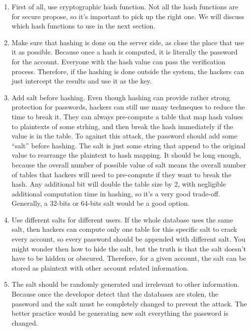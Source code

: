 \documentclass[conference]{IEEEtran}
\begin{document}
\begin{enumerate}[label=\textbf{\arabic*.}]
    \item
First of all, use cryptographic hash function. Not all the hash functions
are for secure propose, so it's important to pick up the right one.
We will discuss 
which hash functions to use in the next section.

    \item
Make sure that hashing is done on the server side,
as close the place that use it as possible.
Because
once a hash is computed, it is literally the password for the account.
Everyone with the hash value can pass the verification process. Therefore,
if the hashing is done outside the system, the hackers can just intercept the results
and use it as the key.

    \item
Add salt before hashing.
Even though hashing can provide rather strong protection for passwords,
hackers can still use many techneques to reduce the time to break it.
They can always pre-compute a table \cite{rainbow} that map
hash values to plaintexts of some strhing, and then
break the hash immediately if the value is in the table.
To against this attack, the password should add some
``salt'' \cite{salt} before hashing.
The salt is just some string that append to the original value to
rearrange the plaintext to hash mapping.
It should be long enough, because the overall number of
possible value of salt means the overall number of tables that
hackers will need to pre-compute if they want to break the hash.
Any additional bit will double the table size by 2, with
negligible additional computation time in hashing, so it's
a very good trade-off.
Generally, a 32-bits or 64-bits salt would be a good option.

    \item
Use different salts for different users.
If the whole database uses the same salt, then hackers
can compute only one table for this specific salt to crack
every account, so every password should be appended with
different salt.
You might wonder then how to hide the salt,
but the truth is that the salt
doesn't have to be hidden or obscured.
Therefore, for a given account, the salt can be stored as plaintext
with other account related information.

    \item
The salt should be randomly generated and irrelevant to other
information. Because once the developor detect that the databases
are stolen, the password and the salt must be completely changed to
prevent the attack. The better practice would be generating new salt
everything the password is changed.
\end{enumerate}
\end{document}
